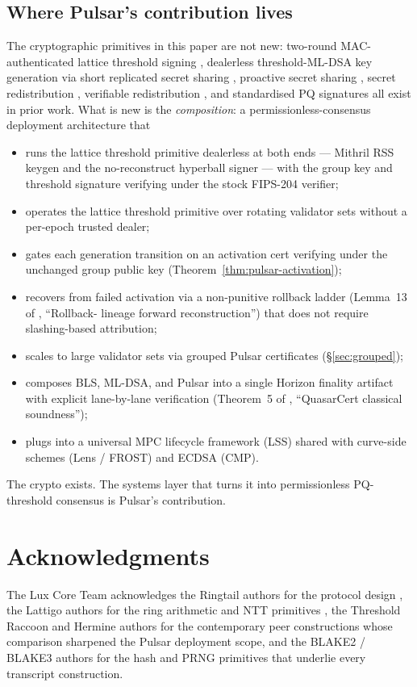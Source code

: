 \subsection{Where Pulsar's contribution lives}
\label{sec:related:contribution}

The cryptographic primitives in this paper are not new: two-round
MAC-authenticated lattice threshold signing
\cite{ringtail,thresholdraccoon,hermine}, dealerless threshold-ML-DSA key
generation via short replicated secret sharing \cite{mithril2026},
proactive secret sharing \cite{hjky97}, secret redistribution
\cite{desmedtjajodia97}, verifiable redistribution \cite{wongwangwing02},
and standardised PQ signatures \cite{fips204,fips205} all exist in prior
work. What is new is the \emph{composition}: a permissionless-consensus
deployment architecture that
\begin{itemize}[nosep]
  \item runs the lattice threshold primitive dealerless at both ends ---
        Mithril RSS keygen \cite{mithril2026} and the no-reconstruct
        hyperball signer --- with the group key and threshold signature
        verifying under the stock FIPS-204 verifier;
  \item operates the lattice threshold primitive over rotating
        validator sets without a per-epoch trusted dealer;
  \item gates each generation transition on an activation cert
        verifying under the unchanged group public key
        (Theorem~\ref{thm:pulsar-activation});
  \item recovers from failed activation via a non-punitive rollback
        ladder (Lemma~13 of \cite{quasarcertsoundness}, ``Rollback-
        lineage forward reconstruction'') that does not require
        slashing-based attribution;
  \item scales to large validator sets via grouped Pulsar certificates
        (\S\ref{sec:grouped});
  \item composes BLS, ML-DSA, and Pulsar into a single Horizon
        finality artifact with explicit lane-by-lane verification
        (Theorem~5 of \cite{quasarcertsoundness}, ``QuasarCert
        classical soundness'');
  \item plugs into a universal MPC lifecycle framework (LSS) shared
        with curve-side schemes (Lens / FROST) and ECDSA (CMP).
\end{itemize}

The crypto exists. The systems layer that turns it into permissionless
PQ-threshold consensus is Pulsar's contribution.

\section*{Acknowledgments}

The Lux Core Team acknowledges the Ringtail authors for the
protocol design \cite{ringtail}, the Lattigo authors for the ring
arithmetic and NTT primitives \cite{lattigov7}, the Threshold Raccoon
\cite{thresholdraccoon} and Hermine \cite{hermine} authors for the
contemporary peer constructions whose comparison sharpened the Pulsar
deployment scope, and the BLAKE2 / BLAKE3 \cite{blake2,blake3} authors
for the hash and PRNG primitives that underlie every transcript
construction.
